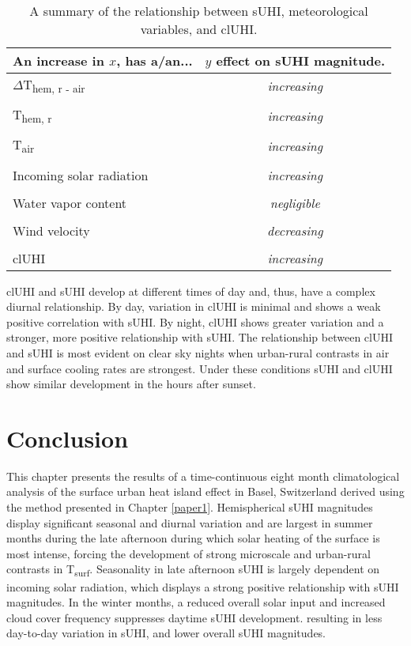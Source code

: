 \begin{bibunit}
\begin{table}[H]
	\centering
	\caption{A summary of the relationship between sUHI, meteorological variables, and clUHI.}
	\label{meteo_cont}
	\begin{tabular}{lc}
		\toprule 
		An increase in $x$, has a/an... & $y$ effect on sUHI magnitude. \\
		\midrule
		$\Delta$T\textsubscript{hem, r - air} &\textit{increasing} \\
		&\\
		T\textsubscript{hem, r} & \textit{increasing} \\
		&\\
		T\textsubscript{air} & \textit{increasing} \\
		&\\
		Incoming solar radiation & \textit{increasing}  \\
		& \\
		Water vapor content & \textit{negligible} \\
		&\\
		Wind velocity &\textit{decreasing} \\
		&\\
		clUHI &\textit{increasing} \\
		\bottomrule
	\end{tabular} 
\end{table}

clUHI and sUHI develop at different times of day and, thus, have a complex diurnal relationship. By day, variation in clUHI is minimal and shows a weak positive correlation with sUHI. By night, clUHI shows greater variation and a stronger, more positive relationship with sUHI. The relationship between clUHI and sUHI is most evident on clear sky nights when urban-rural contrasts in air and surface cooling rates are strongest. Under these conditions sUHI and clUHI  show similar development in the hours after sunset.

\section{Conclusion}

This chapter presents the results of a time-continuous eight month climatological analysis of the surface urban heat island effect in Basel, Switzerland derived using the method presented in Chapter \ref{paper1}. Hemispherical sUHI magnitudes display significant seasonal and diurnal variation and are largest in summer months during the late afternoon during which solar heating of the surface is most intense, forcing the development of strong microscale and urban-rural contrasts in T\textsubscript{surf}. Seasonality in late afternoon sUHI is largely dependent on incoming solar radiation, which displays a strong positive relationship with sUHI magnitudes. In the winter months, a reduced overall solar input and increased cloud cover frequency suppresses daytime sUHI development. resulting in less day-to-day variation in sUHI, and lower overall sUHI magnitudes. 


\end{bibunit}
